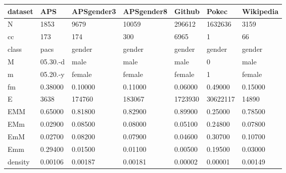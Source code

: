\begin{tabular}{lllllll}
\toprule
dataset &       APS & APSgender3 & APSgender8 &   Github &     Pokec & Wikipedia \\
\midrule
N       &      1853 &       9679 &      10059 &   296612 &   1632636 &      3159 \\
cc      &       173 &        174 &        300 &     6965 &         1 &        66 \\
class   &      pacs &     gender &     gender &   gender &    gender &    gender \\
M       &  05.30.-d &       male &       male &     male &         0 &      male \\
m       &  05.20.-y &     female &     female &   female &         1 &    female \\
fm      &   0.38000 &    0.10000 &    0.11000 &  0.06000 &   0.49000 &   0.15000 \\
E       &      3638 &     174760 &     183067 &  1723930 &  30622117 &     14890 \\
EMM     &   0.65000 &    0.81800 &    0.82900 &  0.89900 &   0.25000 &   0.78500 \\
EMm     &   0.02900 &    0.08500 &    0.08000 &  0.05100 &   0.24800 &   0.07800 \\
EmM     &   0.02700 &    0.08200 &    0.07900 &  0.04600 &   0.30700 &   0.10700 \\
Emm     &   0.29400 &    0.01500 &    0.01100 &  0.00500 &   0.19500 &   0.03000 \\
density &   0.00106 &    0.00187 &    0.00181 &  0.00002 &   0.00001 &   0.00149 \\
\bottomrule
\end{tabular}
